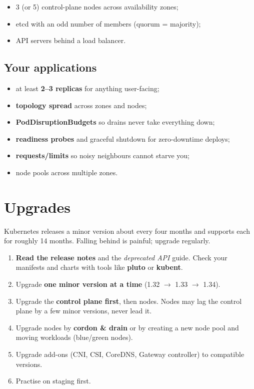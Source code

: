 \begin{itemize}
  \item 3 (or 5) control-plane nodes across availability zones;
  \item etcd with an odd number of members (quorum = majority);
  \item API servers behind a load balancer.
\end{itemize}

\subsection{Your applications}

\begin{itemize}
  \item at least \textbf{2--3 replicas} for anything user-facing;
  \item \textbf{topology spread} across zones and nodes;
  \item \textbf{PodDisruptionBudgets} so drains never take everything down;
  \item \textbf{readiness probes} and graceful shutdown for zero-downtime deploys;
  \item \textbf{requests/limits} so noisy neighbours cannot starve you;
  \item node pools across multiple zones.
\end{itemize}

\section{Upgrades}

Kubernetes releases a minor version about every four months and supports each
for roughly 14 months. Falling behind is painful; upgrade regularly.

\begin{enumerate}
  \item \textbf{Read the release notes} and the \emph{deprecated API} guide.
        Check your manifests and charts with tools like \textbf{pluto} or
        \textbf{kubent}.
  \item Upgrade \textbf{one minor version at a time} (1.32 $\rightarrow$ 1.33 $\rightarrow$ 1.34).
  \item Upgrade the \textbf{control plane first}, then nodes. Nodes may lag
        the control plane by a few minor versions, never lead it.
  \item Upgrade nodes by \textbf{cordon \& drain} or by creating a new node pool
        and moving workloads (blue/green nodes).
  \item Upgrade add-ons (CNI, CSI, CoreDNS, Gateway controller) to compatible versions.
  \item Practise on staging first.
\end{enumerate}

